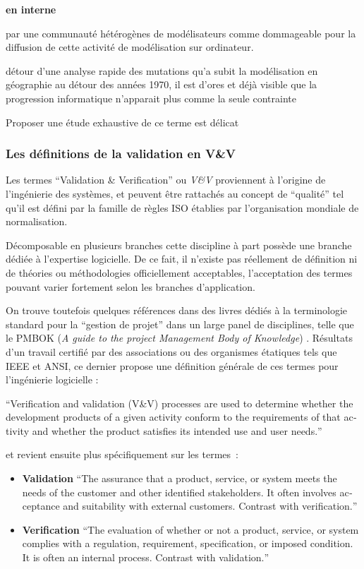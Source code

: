\textbf{en interne}

par une communauté hétérogènes de modélisateurs comme dommageable pour la diffusion de cette activité de modélisation sur ordinateur. 


	détour d'une analyse rapide des mutations qu'a subit la modélisation en géographie au détour des années 1970, il est d'ores et déjà visible que la progression informatique n'apparait plus comme la seule contrainte 

Proposer une étude exhaustive de ce terme est délicat

\subsubsection{Les définitions de la validation en V\&V}
\label{sssec:def_generique_validation}

Les termes \foreignquote{english}{Validation \& Verification} ou \textit{V\&V} proviennent à l'origine de l'ingénierie des systèmes, et peuvent être rattachés au concept de \enquote{qualité} tel qu'il est défini par la famille de règles ISO établies par l'organisation mondiale de normalisation.

Décomposable en plusieurs branches cette discipline à part possède une branche dédiée à l'expertise logicielle. De ce fait, il n'existe pas réellement de définition ni de théories ou méthodologies officiellement acceptables, l'acceptation des termes pouvant varier fortement selon les branches d'application.

On trouve toutefois quelques références dans des livres dédiés à la terminologie standard pour la \enquote{gestion de projet} dans un large panel de disciplines, telle que le PMBOK (\textit{A guide to the project Management Body of Knowledge}) \autocite{PMBOK2013}. Résultats d'un travail certifié par des associations ou des organismes étatiques tels que IEEE et ANSI, ce dernier propose une définition générale de ces termes pour l'ingénierie logicielle :

\foreignquote{english}{Verification and validation (V\&V) processes are used to determine whether the development products of a given activity conform to the requirements of that activity and whether the product satisfies its intended use and user needs.}

et revient ensuite plus spécifiquement sur les termes :

\begin{itemize}
\item \textbf{Validation} \foreignquote{english}{The assurance that a product, service, or system meets the needs of the customer and other identified stakeholders. It often involves acceptance and suitability with external customers. Contrast with verification.}
\item \textbf{Verification} \foreignquote{english}{The evaluation of whether or not a product, service, or system complies with a regulation, requirement, specification, or imposed condition. It is often an internal process. Contrast with validation.}
\end{itemize}


